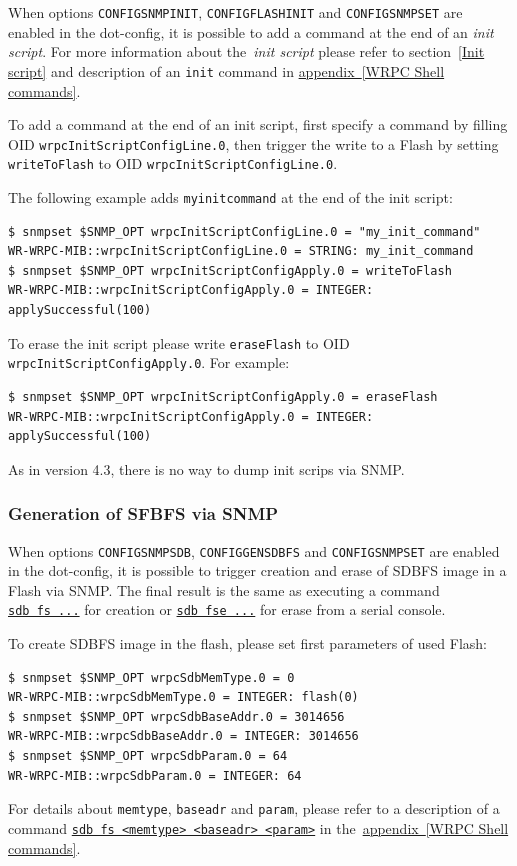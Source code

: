 \documentclass[a4paper, 12pt]{article}
\renewcommand{\_}{\underscore\allowbreak}
\begin{document}
When options \texttt{CONFIG\_SNMP\_INIT}, \texttt{CONFIG\_FLASH\_INIT}
and \texttt{CONFIG\_SNMP\_SET} are enabled in the dot-config, it is possible to
add a command at the end of an \textit{init script}. For more information about
the~\textit{init script} please refer to section~\ref{Init script} and
description of an \texttt{init} command in
\hyperlink{cmd init add}{appendix~\ref{WRPC Shell commands}}.

To add a command at the end of an init script, first specify a command by
filling OID \texttt{wrpcInitScriptConfigLine.0}, then trigger the write to
a Flash by setting \texttt{writeToFlash} to
OID \texttt{wrpcInitScriptConfigLine.0}.

The following example adds \texttt{my\_init\_command} at the end of
the init script:
\begin{lstlisting}
$ snmpset $SNMP_OPT wrpcInitScriptConfigLine.0 = "my_init_command"
WR-WRPC-MIB::wrpcInitScriptConfigLine.0 = STRING: my_init_command
$ snmpset $SNMP_OPT wrpcInitScriptConfigApply.0 = writeToFlash
WR-WRPC-MIB::wrpcInitScriptConfigApply.0 = INTEGER: applySuccessful(100)
\end{lstlisting}

To erase the init script please write \texttt{eraseFlash} to
OID \texttt{wrpcInitScriptConfigApply.0}. For example:
\begin{lstlisting}
$ snmpset $SNMP_OPT wrpcInitScriptConfigApply.0 = eraseFlash
WR-WRPC-MIB::wrpcInitScriptConfigApply.0 = INTEGER: applySuccessful(100)
\end{lstlisting}
As in version 4.3, there is no way to dump init scrips via SNMP.

\subsubsection{Generation of SFBFS via SNMP}
\label{Generation of SFBFS via SNMP}
When options \texttt{CONFIG\_SNMP\_SDB}, \texttt{CONFIG\_GENSDBFS}
and \texttt{CONFIG\_SNMP\_SET}
are enabled in the dot-config, it is possible to trigger creation and erase
of SDBFS image in a Flash via SNMP. The final result is the same as executing
a command \hyperlink{cmd sdb fs}{\texttt{sdb~fs~...}} for creation or
\hyperlink{cmd sdb fse}{\texttt{sdb~fse~...}} for erase from a serial console.

To create SDBFS image in the flash, please set first parameters of used Flash:
\begin{lstlisting}
$ snmpset $SNMP_OPT wrpcSdbMemType.0 = 0
WR-WRPC-MIB::wrpcSdbMemType.0 = INTEGER: flash(0)
$ snmpset $SNMP_OPT wrpcSdbBaseAddr.0 = 3014656
WR-WRPC-MIB::wrpcSdbBaseAddr.0 = INTEGER: 3014656
$ snmpset $SNMP_OPT wrpcSdbParam.0 = 64
WR-WRPC-MIB::wrpcSdbParam.0 = INTEGER: 64
\end{lstlisting}
For details about \texttt{memtype}, \texttt{baseadr} and \texttt{param}, please
refer to a description of a command
\hyperlink{cmd sdb fs}{\texttt{sdb fs <memtype> <baseadr> <param>}}
in the~\hyperlink{cmd sdb fs}{appendix~\ref{WRPC Shell commands}}.
\end{document}
